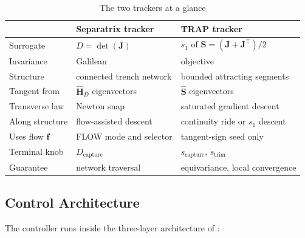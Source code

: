 \documentclass[lettersize,journal]{IEEEtran}
\begin{document}
\begin{table}[!t]
\centering
\caption{The two trackers at a glance}
\label{tab:trackers}
\footnotesize
\setlength{\tabcolsep}{3pt}
\begin{tabular}{lll}
\hline
 & \textbf{Separatrix tracker} & \textbf{TRAP tracker} \\
\hline
Surrogate & $D = \det(\mathbf{J})$ & $s_1$ of $\mathbf{S} = (\mathbf{J}+\mathbf{J}^\top)/2$ \\
Invariance & Galilean & objective \\
Structure & connected trench network & bounded attracting segments \\
Tangent from & $\hat{\mathbf{H}}_D$ eigenvectors & $\hat{\mathbf{S}}$ eigenvectors \\
Transverse law & Newton snap & saturated gradient descent \\
Along structure & flow-assisted descent & continuity ride or $s_1$ descent \\
Uses flow $\mathbf{f}$ & FLOW mode and selector & tangent-sign seed only \\
Terminal knob & $D_{\text{capture}}$ & $s_{\text{capture}}$, $s_{\text{trim}}$ \\
Guarantee & network traversal & equivariance, local convergence \\
\hline
\end{tabular}
\end{table}

\subsection{Control Architecture}
\label{sec:arch}

The controller runs inside the three-layer architecture of \cite{14,30}:
\end{document}
